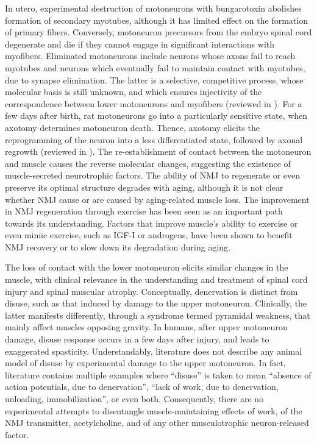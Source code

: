 \documentclass[12pt,english]{report}\usepackage[]{graphicx}\usepackage[]{color}
\begin{document}
In utero, experimental destruction of motoneurons with bungarotoxin
abolishes formation of secondary myotubes, although it has limited
effect on the formation of primary fibers\citep{harris1981embryonic}.
Conversely, motoneuron precursors from the embryo spinal cord degenerate
and die if they cannot engage in significant interactions with myofibers\citep{oconnor1974cell}.
Eliminated motoneurons include neurons whose axons fail to reach myotubes
and neurons which eventually fail to maintain contact with myotubes,
due to synapse elimination. The latter is a selective, competitive
process, whose molecular basis is still unknown, and which ensures
injectivity of the correspondence between lower motoneurons and myofibers
(reviewed in \citep{favero2014hebb-based}). For a few days after
birth, rat motoneurons go into a particularly sensitive state, when
axotomy determines motoneuron death\citep{burls1991absence}. Thence,
axotomy elicits the reprogramming of the neuron into a less differentiated
state, followed by axonal regrowth (reviewed in \citep{kuno1990target,grinnell1995dynamics}).
The re-establishment of contact between the motoneuron and muscle
causes the reverse molecular changes, suggesting the existence of
muscle-secreted neurotrophic factors. The ability of NMJ to regenerate
or even preserve its optimal structure degrades with aging, although
it is not clear whether NMJ cause or are caused by aging-related muscle
loss\citep{gonzalez-freire2014neuromuscular}. The improvement in
NMJ regeneration through exercise has been seen as an important path
towards its understanding. Factors that improve muscle's ability to
exercise or even mimic exercise, such as IGF-I or androgens, have
been shown to benefit NMJ recovery or to slow down its degradation
during aging\citep{serra2013characterization,nishimune2014role,apel2010effect}.

The loss of contact with the lower motoneuron elicits similar changes
in the muscle, with clinical relevance in the understanding and treatment
of spinal cord injury and spinal muscular atrophy. Conceptually, denervation
is distinct from disuse, such as that induced by damage to the upper
motoneuron. Clinically, the latter manifests differently, through
a syndrome termed pyramidal weakness, that mainly affect muscles opposing
gravity\citep{thijs1998distribution}. In humans, after upper motoneuron
damage, disuse response occurs in a few days after injury, and leads
to exaggerated spasticity\citep{purves2001damage}. Understandably,
literature does not describe any animal model of disuse by experimental
damage to the upper motoneuron. In fact, literature contains multiple
examples where ``disuse'' is taken to mean ``absence of action
potentials, due to denervation'', ``lack of work, due to denervation,
unloading, immobilization'', or even both\citep{jackman2004molecular}.
Consequently, there are no experimental attempts to disentangle muscle-maintaining
effects of work, of the NMJ transmitter, acetylcholine, and of any
other musculotrophic neuron-released factor.
\end{document}
